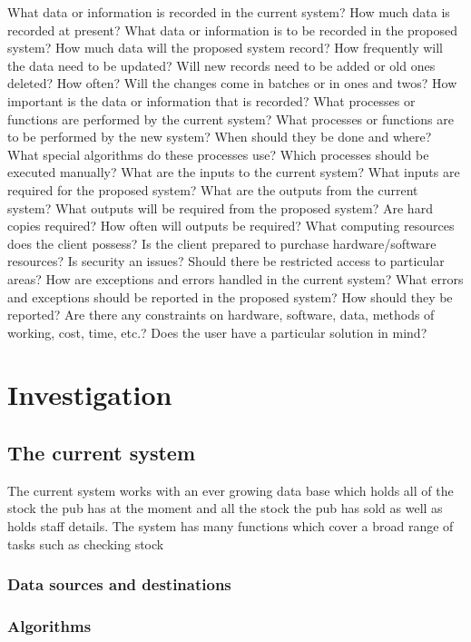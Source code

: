 What data or information is recorded in the current system?
How much data is recorded at present?
What data or information is to be recorded in the proposed system? How much data will the proposed system record?
How frequently will the data need to be updated?
Will new records need to be added or old ones deleted? How often?
Will the changes come in batches or in ones and twos?
How important is the data or information that is recorded?
What processes or functions are performed by the current system?
What processes or functions are to be performed by the new system?
When should they be done and where?
What special algorithms do these processes use?
Which processes should be executed manually?
What are the inputs to the current system?
What inputs are required for the proposed system?
What are the outputs from the current system?
What outputs will be required from the proposed system?
Are hard copies required?
How often will outputs be required?
What computing resources does the client possess?
Is the client prepared to purchase hardware/software resources?
Is security an issues?
Should there be restricted access to particular areas?
How are exceptions and errors handled in the current system?
What errors and exceptions should be reported in the proposed system?
How should they be reported?
Are there any constraints on hardware, software, data, methods of working, cost, time, etc.?
Does the user have a particular solution in mind?


\section{Investigation}

\subsection{The current system}

The current system works with an ever growing data base which holds all of the stock the pub has at the moment and all the stock the pub has sold as well as holds staff details. The system has many functions which cover a broad range of tasks such as checking stock

\subsubsection{Data sources and destinations}


\subsubsection{Algorithms}

